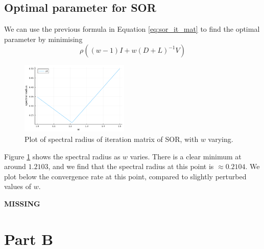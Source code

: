 \documentclass{article}
\numberwithin{equation}{section}
\theoremstyle{definition}
\begin{document}
\subsection{Optimal parameter for SOR}
We can use the previous formula in Equation \eqref{eq:sor_it_mat} to find the optimal parameter by minimising
\begin{equation}
    \rho((w-1)I + w(D+L)^{-1}V)
\end{equation}

\begin{figure}[H]
    \centering
    \includegraphics[width=0.46\textwidth]{fig2.png}
    \caption{Plot of spectral radius of iteration matrix of SOR, with $w$ varying.}
    \label{fig:afig_2}
\end{figure}
Figure \ref{fig:afig_2} shows the spectral radius as $w$ varies. There is a clear minimum at around $1.2103$, and we find that the spectral radius at this point is $\approx 0.2104$. We plot below the convergence rate at this point, compared to slightly perturbed values of $w$.

\textbf{MISSING}

\section{Part B}
\end{document}
